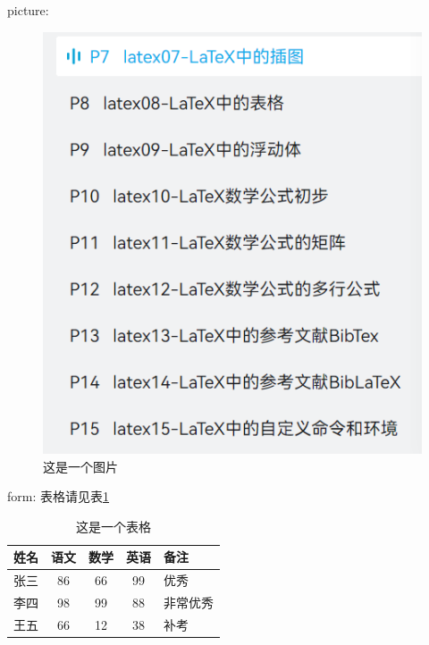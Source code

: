 \documentclass{article}
\begin{document}
    picture:
    \begin{figure}[htbp]
        \centering
        \includegraphics[scale=0.8]{111}
        \caption{这是一个图片}
    \end{figure}

    form: 表格请见表\ref{form}
    \begin{table}[htbp]
        \centering
        \caption{这是一个表格}\label{form}
        \begin{tabular}{l || c | c | c | p{1.5cm}}
            \hline \hline
            姓名 & 语文 & 数学 & 英语 & 备注 \\
            \hline
            张三 & 86 & 66 & 99 & 优秀 \\
            \hline
            李四 & 98 & 99 & 88 & 非常优秀 \\
            \hline
            王五 & 66 & 12 & 38 & 补考 \\
            \hline
        \end{tabular}
    \end{table}
\end{document}
